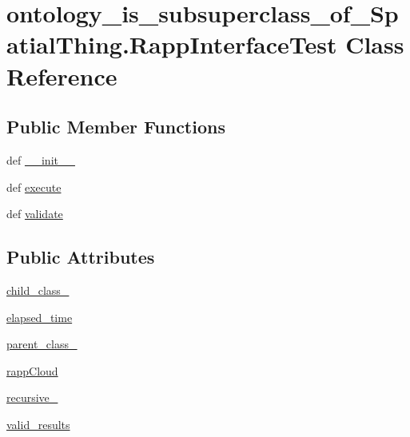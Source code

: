 \hypertarget{classontology__is__subsuperclass__of__SpatialThing_1_1RappInterfaceTest}{\section{ontology\-\_\-is\-\_\-subsuperclass\-\_\-of\-\_\-\-Spatial\-Thing.\-Rapp\-Interface\-Test Class Reference}
\label{classontology__is__subsuperclass__of__SpatialThing_1_1RappInterfaceTest}
}
\subsection*{Public Member Functions}
\begin{DoxyCompactItemize}
\item 
def \hyperlink{classontology__is__subsuperclass__of__SpatialThing_1_1RappInterfaceTest_af9fd3ea64f1917f36d092faf5dc59219}{\-\_\-\-\_\-init\-\_\-\-\_\-}
\item 
def \hyperlink{classontology__is__subsuperclass__of__SpatialThing_1_1RappInterfaceTest_ae5d8694e1d9e52573f592dbe5dbf783c}{execute}
\item 
def \hyperlink{classontology__is__subsuperclass__of__SpatialThing_1_1RappInterfaceTest_a86c99e1377e9435c784add863387ec7b}{validate}
\end{DoxyCompactItemize}
\subsection*{Public Attributes}
\begin{DoxyCompactItemize}
\item 
\hyperlink{classontology__is__subsuperclass__of__SpatialThing_1_1RappInterfaceTest_acb5c540bde87b12b54f96639e399f52b}{child\-\_\-class\-\_\-}
\item 
\hyperlink{classontology__is__subsuperclass__of__SpatialThing_1_1RappInterfaceTest_a87712c4780d995f0dbb6fdc07e5f8d5a}{elapsed\-\_\-time}
\item 
\hyperlink{classontology__is__subsuperclass__of__SpatialThing_1_1RappInterfaceTest_a6ea2236e6eff4d4f75e45a48e636b567}{parent\-\_\-class\-\_\-}
\item 
\hyperlink{classontology__is__subsuperclass__of__SpatialThing_1_1RappInterfaceTest_ac3419615d9c570bbbf77bf80d3f9425b}{rapp\-Cloud}
\item 
\hyperlink{classontology__is__subsuperclass__of__SpatialThing_1_1RappInterfaceTest_a73c6e01c2e006cd4f6de0323cf845651}{recursive\-\_\-}
\item 
\hyperlink{classontology__is__subsuperclass__of__SpatialThing_1_1RappInterfaceTest_a6643a11c2835d7d6e72acf58b9ead5f7}{valid\-\_\-results}
\end{DoxyCompactItemize}


